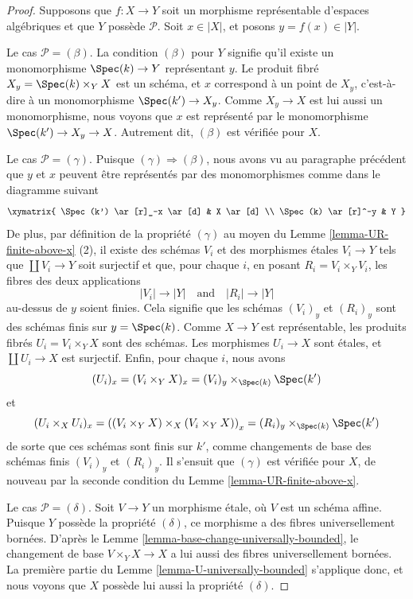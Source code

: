 \begin{proof}
Supposons que $f : X \to Y$ soit un morphisme représentable d'espaces
algébriques et que $Y$ possède $\mathcal{P}$. Soit $x \in |X|$, et posons
$y = f(x) \in |Y|$.

\medskip\noindent
Le cas $\mathcal{P} = (\beta)$. La condition $(\beta)$ pour $Y$ signifie
qu'il existe un monomorphisme $\Spec(k) \to Y$ représentant $y$.
Le produit fibré $X_y = \Spec(k) \times_Y X$ est un schéma, et
$x$ correspond à un point de $X_y$, c'est-à-dire à un monomorphisme
$\Spec(k') \to X_y$. Comme $X_y \to X$ est lui aussi un monomorphisme,
nous voyons que $x$ est représenté par le monomorphisme
$\Spec(k') \to X_y \to X$.
Autrement dit, $(\beta)$ est vérifiée pour $X$.

\medskip\noindent
Le cas $\mathcal{P} = (\gamma)$. Puisque $(\gamma) \Rightarrow (\beta)$,
nous avons vu au paragraphe précédent que $y$ et $x$ peuvent être
représentés par des monomorphismes comme dans le diagramme suivant
$$
\xymatrix{
\Spec(k') \ar[r]_-x \ar[d] & X \ar[d] \\
\Spec(k) \ar[r]^-y & Y
}
$$
De plus, par définition de la propriété $(\gamma)$ au moyen du
Lemme \ref{lemma-UR-finite-above-x} (2),
il existe des schémas $V_i$ et des morphismes étales $V_i \to Y$ tels que
$\coprod V_i \to Y$ soit surjectif et que, pour chaque $i$, en posant
$R_i = V_i \times_Y V_i$, les fibres des deux applications
$$
|V_i| \longrightarrow |Y|
\quad\text{and}\quad
|R_i| \longrightarrow |Y|
$$
au-dessus de $y$ soient finies. Cela signifie que les schémas
$(V_i)_y$ et $(R_i)_y$ sont des schémas finis sur $y = \Spec(k)$.
Comme $X \to Y$ est représentable, les produits fibrés
$U_i = V_i \times_Y X$ sont des schémas. Les morphismes $U_i \to X$
sont étales, et $\coprod U_i \to X$ est surjectif. Enfin, pour chaque $i$,
nous avons
$$
(U_i)_x =
(V_i \times_Y X)_x =
(V_i)_y \times_{\Spec(k)} \Spec(k')
$$
et
$$
(U_i \times_X U_i)_x =
\left((V_i \times_Y X) \times_X (V_i \times_Y X)\right)_x =
(R_i)_y \times_{\Spec(k)} \Spec(k')
$$
de sorte que ces schémas sont finis sur $k'$, comme changements de base des
schémas finis $(V_i)_y$ et $(R_i)_y$. Il s'ensuit que $(\gamma)$ est
vérifiée pour $X$, de nouveau par la seconde condition du
Lemme \ref{lemma-UR-finite-above-x}.

\medskip\noindent
Le cas $\mathcal{P} = (\delta)$. Soit $V \to Y$ un morphisme étale, où
$V$ est un schéma affine. Puisque $Y$ possède la propriété $(\delta)$,
ce morphisme a des fibres universellement bornées. D'après le
Lemme \ref{lemma-base-change-universally-bounded},
le changement de base $V \times_Y X \to X$ a lui aussi des fibres
universellement bornées. La première partie du
Lemme \ref{lemma-U-universally-bounded}
s'applique donc, et nous voyons que $X$ possède lui aussi la propriété
$(\delta)$.


\end{proof}
